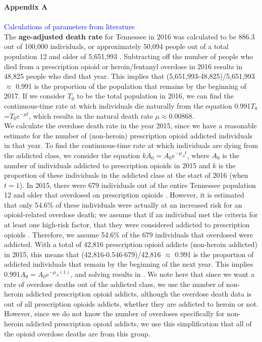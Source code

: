 \documentclass[12pt]{article}
\begin{document}
\textbf{Appendix A} \\ \\
\textcolor{blue}{Calculations of parameters from literature} \\
The \textbf{age-adjusted death rate} for Tennessee in 2016 was calculated to be 886.3 out of 100,000 individuals, or approximately 50,094 people out of a total population 12 and older of 5,651,993 \cite{Kaiser}. Subtracting off the number of people who died from a prescription opioid or heroin/fentanyl overdose in 2016 results in 48,825 people who died that year. This implies that (5,651,993-48,825)/5,651,993 $\approx$ 0.991 is the proportion of the population that remains by the beginning of 2017. If we consider $T_0$ to be the total population in 2016, we can find the continuous-time rate at which individuals die naturally from the equation 0.991$T_0$=$T_0e^{-\mu t}$, which results in the natural death rate $\mu \approx 0.00868$. \\

We calculate the overdose death rate in the year 2015, since we have a reasonable estimate for the number of (non-heroin) prescription opioid addicted individuals in that year. To find the continuous-time rate at which individuals are dying from the addicted class, we consider the equation $k A_{0}=A_{0}e^{-\mu_{A}t}$, where $A_0$ is the number of individuals addicted to prescription opioids in 2015 and $k$ is the proportion of these individuals in the addicted class at the start of 2016 (when $t=1$). In 2015, there were 679 individuals out of the entire Tennessee population 12 and older that overdosed on prescription opioids \cite{PDO}. However, it is estimated that only 54.6\% of these individuals were actually at an increased risk for an opioid-related overdose death; we assume that if an individual met the criteria for at least one high-risk factor, that they were considered addicted to prescription opioids \cite{Gwira}. Therefore, we assume 54.6\% of the 679 individuals that overdosed were addicted. With a total of 42,816 prescription opioid addicts (non-heroin addicted) in 2015, this means that (42,816-0.546$\cdot$679)/42,816 $\approx$ 0.991 is the proportion of addicted individuals that remain by the beginning of the next year. This implies 0.991$A_0=A_0 e^{-\mu_{A}(1)}$, and solving results in \unboldmath. We note here that since we want a rate of overdose deaths out of the addicted class, we use the number of non-heroin addicted prescription opioid addicts, although the overdose death data is out of all prescription opioids addicts, whether they are addicted to heroin or not. However, since we do not know the number of overdoses specifically for non-heroin addicted prescription opioid addicts, we use this simplification that all of the opioid overdose deaths are from this group. \\
\end{document}
